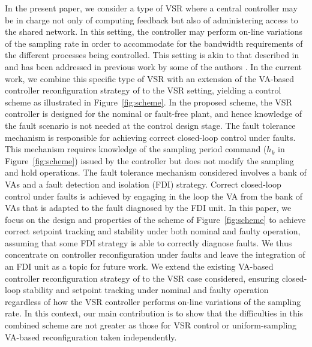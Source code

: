 \documentclass[letterpaper, 10 pt, conference]{ieeeconf}
\begin{document}
In the present paper, we consider a type of VSR where a central
controller may be in charge not only of computing feedback but also of
administering access to the shared network. In this setting, the
controller may perform on-line variations of the sampling rate in
order to accommodate for the bandwidth requirements of the different
processes being controlled. This setting is akin to that described in
\cite{cereke_rts02} and has been addressed in previous work by some of
the authors \cite{haimoose_nahs12, haimo_ifac2011,osehaimo_rpic2011,
  osehaimo_aadeca2012}. In the current work, we combine this specific type of VSR with an extension of the VA-based controller reconfiguration strategy of \cite{seron_bankVA_ifac11} to the VSR setting, yielding a control scheme as illustrated in Figure~\ref{fig:scheme}. In the proposed scheme, the VSR controller is designed for the nominal or fault-free plant, and hence knowledge of the fault scenario is not needed at the control design stage. The fault tolerance mechanism is responsible for achieving correct closed-loop control under faults. This mechanism requires knowledge of the sampling period command ($h_k$ in Figure~\ref{fig:scheme}) issued by the controller but does not modify the sampling and hold operations. The fault tolerance mechanism considered involves a bank of VAs and a fault detection and isolation (FDI) strategy. Correct closed-loop control under faults is achieved by engaging in the loop the VA from the bank of VAs that is adapted to
the fault diagnosed by the FDI unit. In this paper, we focus on the design and properties of the scheme of Figure~\ref{fig:scheme} to achieve correct setpoint tracking and stability under both nominal and faulty operation, assuming that some FDI strategy is able to correctly diagnose faults. We thus concentrate on controller reconfiguration under faults and leave the integration of an FDI unit as a topic for future work. 
We extend the existing VA-based controller reconfiguration strategy of \cite{seron_bankVA_ifac11} to the VSR case considered, ensuring closed-loop stability and setpoint tracking under nominal and faulty operation regardless of how the VSR controller performs on-line variations of the sampling rate. In this context, our main contribution is to show that the difficulties in this combined scheme are not greater as those for VSR control or uniform-sampling VA-based reconfiguration taken independently.
\end{document}
